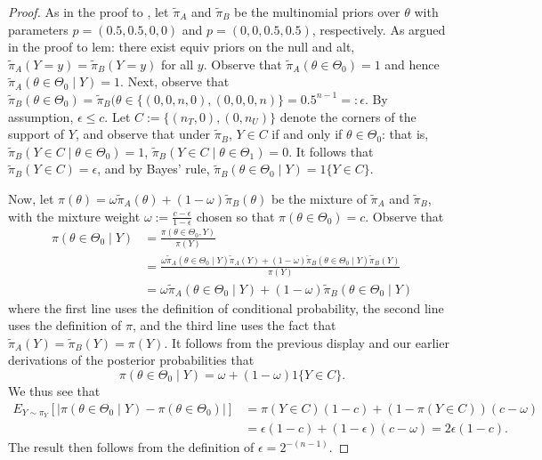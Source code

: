 \documentclass[12pt,reqno]{amsart}
\begin{document}
\begin{proof}
As in the proof to , let
$\tilde\pi_A$ and $\tilde\pi_B$ be the multinomial priors over $\theta$ with parameters
$p=(0.5,0.5,0,0)$ and $p=(0,0,0.5,0.5)$, respectively. As argued in the proof to \Cref
{lem: there exist equiv priors on the null and alt}, $\tilde{\pi}_A(Y{=}y) = \tilde{\pi}_B
(Y{=}y)$ for all $y$. Observe that $\tilde{\pi}_A(\theta \in \Theta_0) = 1$ and hence
$\tilde\pi_A( \theta \in \Theta_0 \mid Y) = 1$. Next, observe that $\tilde\pi_B(\theta \in
\Theta_0) = \tilde\pi_B( \theta \in \{(0,0,n,0),(0,0,0,n)\} = 0.5^{n-1} =: \epsilon$. By assumption, $\epsilon \leq c$. Let $C := \{(n_T,0), (0,n_U)\}$
denote the corners of the support of $Y$, and observe that under $\tilde{\pi}_B$, $Y \in
C$ if and only if $\theta \in \Theta_0$: that is, $\tilde\pi_B( Y \in C \mid \theta \in
\Theta_0) = 1$, $\tilde\pi_B(Y \in C \mid \theta \in \Theta_1) = 0$.  It follows that
$\tilde\pi_B(Y \in C) = \epsilon$, and by Bayes' rule, $\tilde\pi_B(\theta \in \Theta_0
\mid Y) = 1\{ Y \in C \}$.

Now, let $\pi(\theta) = \omega \tilde\pi_A(\theta) + (1-\omega) \tilde\pi_B(\theta)$ be the mixture of $\tilde\pi_A$ and $\tilde\pi_B$, with the mixture weight $\omega := \tfrac{c-\epsilon}{1-\epsilon}$ chosen so that $\pi(\theta \in \Theta_0) = c$. Observe that
\begin{align*}
   \pi(\theta \in \Theta_0 \mid Y) &= \frac{ \pi(\theta \in \Theta_0, Y) }{ \pi(Y) } \\ 
   &= \frac{ \omega \tilde\pi_A(\theta \in \Theta_0 \mid Y) \tilde\pi_A(Y) + (1-\omega) \tilde\pi_B(\theta \in \Theta_0 \mid Y) \tilde\pi_B(Y)  }{ \pi(Y) }  \\
   &= \omega \tilde \pi_A(\theta \in \Theta_0 \mid Y) + (1-\omega) \tilde\pi_B(\theta \in \Theta_0 \mid Y) 
\end{align*}
where the first line uses the definition of conditional probability, the second line uses the definition of $\pi$, and the third line uses the fact that $\tilde\pi_A(Y) = \tilde\pi_B(Y) = \pi(Y)$. It follows from the previous display and our earlier derivations of the posterior probabilities that 
\[ \pi(\theta \in \Theta_0 \mid Y) = \omega + (1-\omega) 1\{Y \in C\}. \]
We thus see that
\begin{align*}
 E_{Y \sim \pi_Y}\left[ \left|  \pi(\theta \in \Theta_0 \mid Y) - \pi(\theta \in \Theta_0)   \right| \right] &= \pi(Y \in C) (1-c) + (1- \pi(Y\in C)) (c- \omega ) \\
 &= \epsilon \left(1 - c\right) + (1- \epsilon) (c - \omega) = 2 \epsilon (1-c).
\end{align*}
\noindent The result then follows from the definition of $\epsilon = 2^{-(n-1)}$.
\end{proof}
\end{document}
